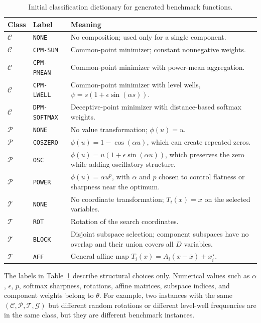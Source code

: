 \documentclass[11pt,a4paper]{article}
\theoremstyle{remark}
\theoremstyle{plain}
\begin{document}
\begin{table}[t]
	\centering
	\small
	\caption{Initial classification dictionary for generated benchmark functions.}
	\label{tab:classification-dictionary}
	\begin{tabular}{p{}p{}p{}}
		\hline
		Class & Label & Meaning \\
		\hline
		\(\mathcal{C}\) & \texttt{NONE} &
		No composition; used only for a single component. \\
		\(\mathcal{C}\) & \texttt{CPM-SUM} &
		Common-point minimizer; constant nonnegative weights. \\
		\(\mathcal{C}\) & \texttt{CPM-PMEAN} &
		Common-point minimizer with power-mean aggregation. \\
		\(\mathcal{C}\) & \texttt{CPM-LWELL} &
		Common-point minimizer with level wells,
		\(\psi=s(1+\epsilon\sin(\alpha s))\). \\
		\(\mathcal{C}\) & \texttt{DPM-SOFTMAX} &
		Deceptive-point minimizer with distance-based softmax weights. \\
		\hline
		\(\mathcal{P}\) & \texttt{NONE} &
		No value transformation; \(\phi(u)=u\). \\
		\(\mathcal{P}\) & \texttt{COSZERO} &
		\(\phi(u)=1-\cos(\alpha u)\), which can create repeated zeros. \\
		\(\mathcal{P}\) & \texttt{OSC} &
		\(\phi(u)=u(1+\epsilon\sin(\alpha u))\), which preserves the zero
		while adding oscillatory structure. \\
		\(\mathcal{P}\) & \texttt{POWER} &
		\(\phi(u)=\alpha u^p\), with \(\alpha\) and \(p\) chosen to control
		flatness or sharpness near the optimum. \\
		\hline
		\(\mathcal{T}\) & \texttt{NONE} &
		No coordinate transformation; \(T_i(x)=x\) on the selected variables. \\
		\(\mathcal{T}\) & \texttt{ROT} &
		Rotation of the search coordinates. \\
		\(\mathcal{T}\) & \texttt{BLOCK} &
		Disjoint subspace selection; component subspaces have no overlap and
		their union covers all \(D\) variables. \\
		\(\mathcal{T}\) & \texttt{AFF} &
		General affine map \(T_i(x)=A_i(x-\bar{x})+x_i^\star\). \\
		\hline
	\end{tabular}
\end{table}

The labels in Table~\ref{tab:classification-dictionary} describe structural
choices only. Numerical values such as \(\alpha\), \(\epsilon\), \(p\), softmax
sharpness, rotations, affine matrices, subspace indices, and component weights
belong to \(\theta\). For example, two instances with the same
\((\mathcal{C},\mathcal{P},\mathcal{T},\mathcal{G})\) but different random
rotations or different level-well frequencies are in the same class, but they
are different benchmark instances.
\end{document}

